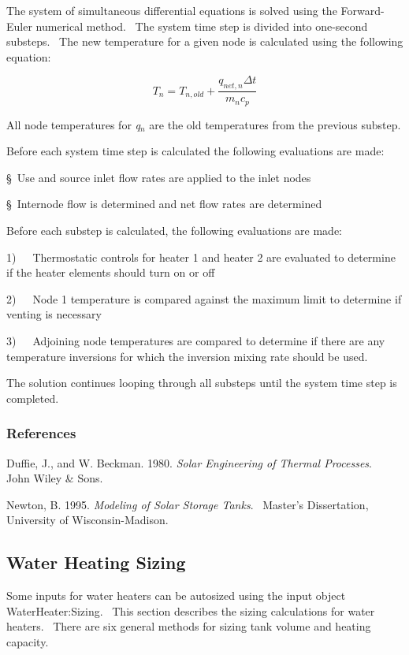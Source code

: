 The system of simultaneous differential equations is solved using the Forward-Euler numerical method.~ The system time step is divided into one-second substeps.~ The new temperature for a given node is calculated using the following equation:

\begin{equation}
{T_n} = {T_{n,old}} + \frac{{{q_{net,n}}\Delta t}}{{{m_n}{c_p}}}
\end{equation}

All node temperatures for \emph{q\(_{n}\)} are the old temperatures from the previous substep.

Before each system time step is calculated the following evaluations are made:

§~Use and source inlet flow rates are applied to the inlet nodes

§~Internode flow is determined and net flow rates are determined

Before each substep is calculated, the following evaluations are made:

1)~~~Thermostatic controls for heater 1 and heater 2 are evaluated to determine if the heater elements should turn on or off

2)~~~Node 1 temperature is compared against the maximum limit to determine if venting is necessary

3)~~~Adjoining node temperatures are compared to determine if there are any temperature inversions for which the inversion mixing rate should be used.

The solution continues looping through all substeps until the system time step is completed.

\subsubsection{References}\label{references-1-017}

Duffie, J., and W. Beckman. 1980. \emph{Solar Engineering of Thermal Processes}.~ John Wiley \& Sons.

Newton, B. 1995. \emph{Modeling of Solar Storage Tanks}.~ Master's Dissertation, University of Wisconsin-Madison.

\subsection{Water Heating Sizing}\label{water-heating-sizing}

Some inputs for water heaters can be autosized using the input object WaterHeater:Sizing.~ This section describes the sizing calculations for water heaters.~ There are six general methods for sizing tank volume and heating capacity.

